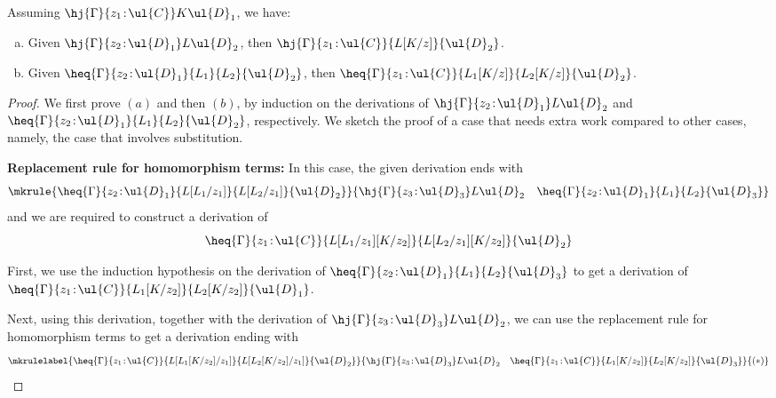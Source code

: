 \begin{theorem} 
\label{thm:homsubstitution}
Assuming $\hj {\Gamma} {z_1 \!:\! \ul{C}} K {\ul{D}_1}$, we have:
\begin{enumerate}[(a)]
\item Given $\hj {\Gamma} {z_2 \!:\! \ul{D}_1} L {\ul{D}_2}$, then $\hj {\Gamma} {z_1 \!:\! \ul{C}} {L[K/z]} {\ul{D}_2}$.
\item Given $\heq {\Gamma} {z_2 \!:\! \ul{D}_1} {L_1} {L_2} {\ul{D}_2}$, then $\heq {\Gamma} {z_1 \!:\! \ul{C}} {L_1[K/z]} {L_2[K/z]} {\ul{D}_2}$.
\end{enumerate}
\end{theorem}

\begin{proof}
We first prove $(a)$ and then $(b)$, by induction on the derivations of \linebreak $\hj {\Gamma} {z_2 \!:\! \ul{D}_1} L {\ul{D}_2}$ and $\heq {\Gamma} {z_2 \!:\! \ul{D}_1} {L_1} {L_2} {\ul{D}_2}$, respectively. 
We sketch the proof of a case that needs extra work compared to other cases, namely, the case that involves substitution.


\vspace{0.2cm}

\noindent \textbf{Replacement rule for homomorphism terms:}
In this case, the given derivation ends with
\[
\mkrule
{\heq {\Gamma} {z_2 \!:\! \ul{D}_1} {L[L_1/z_1]} {L[L_2/z_1]} {\ul{D}_2}}
{\hj {\Gamma} {z_3 \!:\! \ul{D}_3} L {\ul{D}_2} \quad \heq {\Gamma} {z_2 \!:\! \ul{D}_1} {L_1} {L_2} {\ul{D}_3}}
\]
and we are required to construct a derivation of 
\[
{\heq {\Gamma} {z_1 \!:\! \ul{C}} {L[L_1/z_1][K/z_2]} {L[L_2/z_1][K/z_2]} {\ul{D}_2}}
\]

First, we use the induction hypothesis on the derivation of  ${\heq {\Gamma} {z_2 \!:\! \ul{D}_1} {L_1} {L_2} {\ul{D}_3}}$ to get a derivation of $\heq {\Gamma} {z_1 \!:\! \ul{C}} {L_1[K/z_2]} {L_2[K/z_2]} {\ul{D}_1}$. 

Next, using this derivation, together with the derivation of $\hj {\Gamma} {z_3 \!:\! \ul{D}_3} L {\ul{D}_2}$, we can use the replacement rule for homomorphism terms to get a derivation ending with
\[
\mkrulelabel
{\heq {\Gamma} {z_1 \!:\! \ul{C}} {L[L_1[K/z_2]/z_1]} {L[L_2[K/z_2]/z_1]} {\ul{D}_2}}
{\hj {\Gamma} {z_3 \!:\! \ul{D}_3} L {\ul{D}_2} \quad \heq {\Gamma} {z_1 \!:\! \ul{C}} {L_1[K/z_2]} {L_2[K/z_2]} {\ul{D}_3}}
{(*)}
\]


\end{proof}
